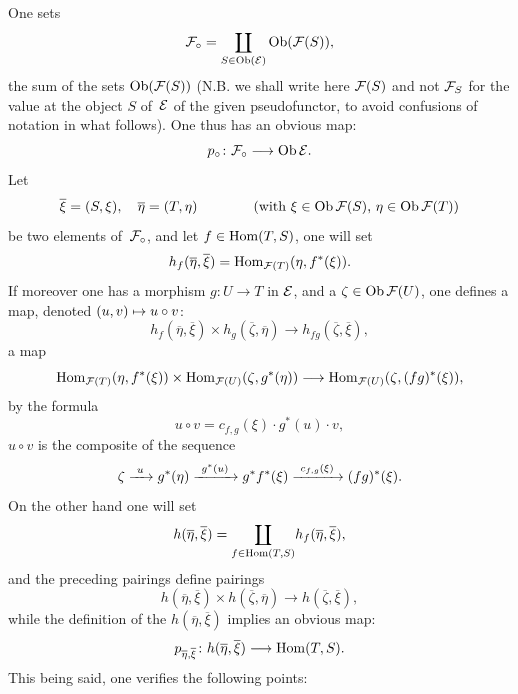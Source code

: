 One sets
$$
\cal{F}_\circ=\underset{S\in\Ob(\cal{E})}\coprod
\Ob(\cal{F}(S)),
$$
the sum of the sets
$\Ob(\cal{F}(S))$
(N.B. we shall write here $\cal{F}(S)$ and not $\cal{F}_S$ for the value at
the object $S$ of~$\cal{E}$ of the given pseudofunctor, to avoid
confusions of notation in what follows). One thus has an obvious
map:
$$
p_\circ\colon\cal{F}_\circ\to\Ob\cal{E}.
$$
Let
$$
\overline{\xi}
=(S,\xi),\quad \overline{\eta}=(T,\eta)\qquad\qquad
\text{(with $\xi\in\Ob\cal{F}(S)$, $\eta\in\Ob\cal{F}(T)$)}
$$
be two elements of~$\cal{F}_\circ$, and let $f\in\Hom(T,S)$, one
will set
$$
h_f(\overline{\eta},\overline{\xi})=\Hom_{\cal{F}(T)}(\eta,f^*(\xi)).
$$
If moreover one has a morphism $g\colon U\to T$ in $\cal{E}$, and a
$\zeta\in\Ob\cal{F}(U)$, one defines a map, denoted
$(u,v)\mto u\circ v$:
$$
h_f(\overline{\eta},\overline{\xi})\times
h_g(\overline{\zeta},\overline{\eta})\to
h_{fg}(\overline{\zeta},\overline{\xi}),
$$
\ie a map
$$
\Hom_{\cal{F}(T)}(\eta,f^*(\xi))\times\Hom_{\cal{F}(U)}(\zeta,g^*(\eta))
\to \Hom_{\cal{F}(U)}(\zeta,(fg)^*(\xi)),
$$
by the formula
$$
u\circ v=c_{f,g}(\xi)\cdot g^*(u)\cdot v,
$$
\ie $u\circ v$ is the composite of the sequence
$$
\zeta\lto{u}
g^*(\eta)\lto{g^*(u)}
g^*f^*(\xi)\lto{c_{f,g}(\xi)} (fg)^*(\xi).
$$
On the other hand one will set
$$
h(\overline{\eta},\overline{\xi})=\underset{f\in\Hom(T,S)}\coprod
h_f(\overline{\eta},\overline{\xi}),
$$
and the preceding pairings define
pairings
$$
h(\overline{\eta},\overline{\xi})\times
h(\overline{\zeta},\overline{\eta})\to
h(\overline{\zeta},\overline{\xi}),
$$
while the definition of the $h(\overline{\eta},\overline{\xi})$
implies an obvious map:
$$
p_{\overline{\eta},\overline{\xi}}\colon
h(\overline{\eta},\overline{\xi})\to \Hom(T,S).
$$
This being said, one verifies the following points:

